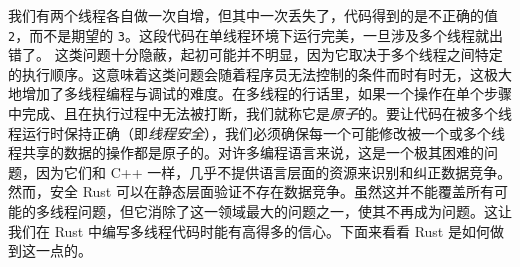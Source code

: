 我们有两个线程各自做一次自增，但其中一次丢失了，代码得到的是不正确的值 \texttt{2}，而不是期望的 \texttt{3}。这段代码在单线程环境下运行完美，一旦涉及多个线程就出错了。
\label{idx:idx_93e6f852}
\label{idx:idx_b473d354}
这类问题十分隐蔽，起初可能并不明显，因为它取决于多个线程之间特定的执行顺序。这意味着这类问题会随着程序员无法控制的条件而时有时无，这极大地增加了多线程编程与调试的难度。在多线程的行话里，如果一个操作在单个步骤中完成、且在执行过程中无法被打断，我们就称它是\emph{原子}的。要让代码在被多个线程运行时保持正确（即\emph{线程安全}），我们必须确保每一个可能修改被一个或多个线程共享的数据的操作都是原子的。对许多编程语言来说，这是一个极其困难的问题，因为它们和 C++ 一样，几乎不提供语言层面的资源来识别和纠正数据竞争。
然而，安全 Rust 可以在静态层面验证不存在数据竞争。虽然这并不能覆盖所有可能的多线程问题，但它消除了这一领域最大的问题之一，使其不再成为问题。这让我们在 Rust 中编写多线程代码时能有高得多的信心。下面来看看 Rust 是如何做到这一点的。
